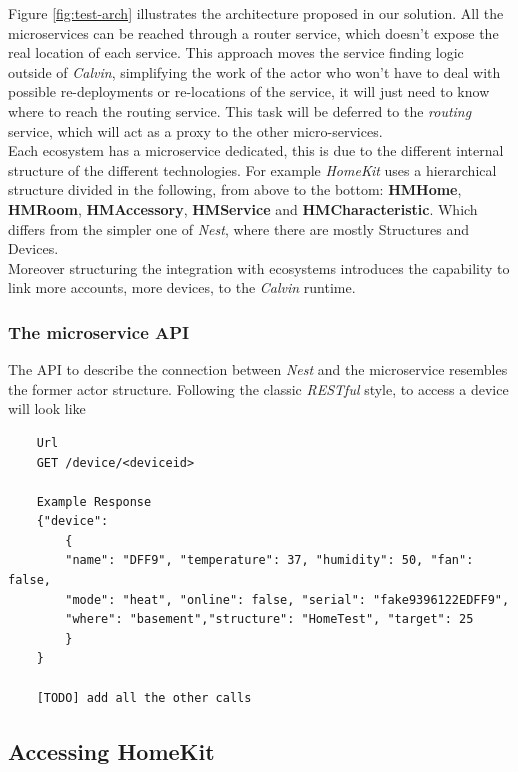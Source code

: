Figure \ref{fig:test-arch} illustrates the architecture proposed in our solution.
All the microservices can be reached through a router service, which doesn't expose
the real location of each service. This approach moves the service finding logic outside
of \textit{Calvin}, simplifying the work of the actor who won't have to deal with possible
re-deployments or re-locations of the service, it will just need to know where to reach the
routing service. This task will be deferred to the \textit{routing} service, which will act
as a proxy to the other micro-services.\\
Each ecosystem has a microservice dedicated, this is due to the different internal structure of the
different technologies. For example \textit{HomeKit} uses a hierarchical structure divided in the following,
from above to the bottom: \textbf{HMHome}, \textbf{HMRoom}, \textbf{HMAccessory}, \textbf{HMService} and \textbf{HMCharacteristic}.
Which differs from the simpler one of \textit{Nest}, where there are mostly Structures and Devices.\\
Moreover structuring the integration with ecosystems introduces the capability to link more accounts, more devices,
to the \textit{Calvin} runtime.

\subsubsection{The microservice API}

The API to describe the connection between \textit{Nest} and the microservice
resembles the former actor structure.
Following the classic \textit{RESTful} style, to access a device will look like
\begin{verbatim}
    Url
    GET /device/<deviceid>

    Example Response
    {"device":
        {
        "name": "DFF9", "temperature": 37, "humidity": 50, "fan": false,
        "mode": "heat", "online": false, "serial": "fake9396122EDFF9",
        "where": "basement","structure": "HomeTest", "target": 25
        }
    }

    [TODO] add all the other calls
\end{verbatim}





\subsection{Accessing HomeKit}

